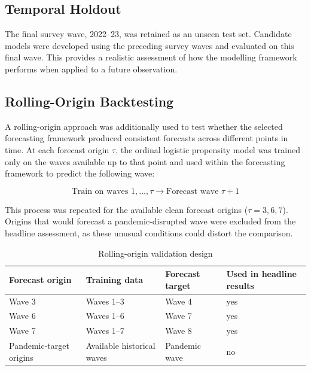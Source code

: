 \documentclass[ %
                    author={Ashrey Ashrey, Sanya Kapoor, Trisha Sharma, Yash Bhooshan Pandloskar},
                supervisor={Dr. Dalila O’Grady},
                    degree={MSc},
                     title={Using machine learning to forecast physical activity participation, volunteering and activity patterns in London},
                  subtitle={},
                      type={},
                      year={2021}]{dissertation}
\begin{document}
\FloatBarrier
\subsection{Temporal Holdout}

\noindent
The final survey wave, 2022--23, was retained as an unseen test set. Candidate models were developed using the preceding survey waves and evaluated on this final wave. This provides a realistic assessment of how the modelling framework performs when applied to a future observation.

\FloatBarrier
\subsection{Rolling-Origin Backtesting}

\noindent
A rolling-origin approach was additionally used to test whether the selected forecasting framework produced consistent forecasts across different points in time. At each forecast origin \(\tau\), the ordinal logistic propensity model was trained only on the waves available up to that point and used within the forecasting framework to predict the following wave:

\[
\text{Train on waves }1,\ldots,\tau
\rightarrow
\text{Forecast wave }\tau+1
\]

This process was repeated for the available clean forecast origins (\(\tau=3,6,7\)). Origins that would forecast a pandemic-disrupted wave were excluded from the headline assessment, as these unusual conditions could distort the comparison.

\begin{table}[!htb]
\centering
\label{tab:rolling-origin-validation}
\begin{tabular}{llll}
\toprule
\textbf{Forecast origin} &
\textbf{Training data} &
\textbf{Forecast target} &
\textbf{Used in headline results} \\
\midrule
Wave 3                  & Waves 1--3                  & Wave 4        & yes \\
Wave 6                  & Waves 1--6                  & Wave 7        & yes \\
Wave 7                  & Waves 1--7                  & Wave 8        & yes \\
Pandemic-target origins & Available historical waves & Pandemic wave & no \\
\bottomrule
\end{tabular}
\caption{Rolling-origin validation design}
\end{table}
\end{document}

